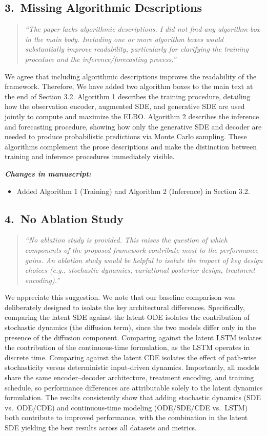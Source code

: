\documentclass[12pt]{article}
\newcommand{\reviewercomment}[1]{%
  \begin{quote}
  \textcolor{reviewergray}{\textit{``#1''}}
  \end{quote}
}
\newcommand{\changes}{\vspace{0.3em}\noindent\textbf{\textit{Changes in manuscript:}}\vspace{0.2em}}
\begin{document}
\subsection*{3.\ Missing Algorithmic Descriptions}

\reviewercomment{The paper lacks algorithmic descriptions. I did not find any algorithm box in the main body. Including one or more algorithm boxes would substantially improve readability, particularly for clarifying the training procedure and the inference/forecasting process.}

We agree that including algorithmic descriptions improves the readability of the framework.
Therefore, We have added two algorithm boxes to the main text at the end of Section 3.2. Algorithm 1 describes the training procedure, detailing how the observation encoder, augmented SDE, and generative SDE are used jointly to compute and maximize the ELBO. Algorithm 2 describes the inference and forecasting procedure, showing how only the generative SDE and decoder are needed to produce probabilistic predictions via Monte Carlo sampling. These algorithms complement the prose descriptions and make the distinction between training and inference procedures immediately visible.

\changes
\begin{itemize}[leftmargin=2em]
\item Added Algorithm 1 (Training) and Algorithm 2 (Inference) in Section 3.2.
\end{itemize}

\subsection*{4.\ No Ablation Study}

\reviewercomment{No ablation study is provided. This raises the question of which components of the proposed framework contribute most to the performance gains. An ablation study would be helpful to isolate the impact of key design choices (e.g., stochastic dynamics, variational posterior design, treatment encoding).}

We appreciate this suggestion. We note that our baseline comparison was deliberately designed to isolate the key architectural differences. Specifically, comparing the latent SDE against the latent ODE isolates the contribution of stochastic dynamics (the diffusion term), since the two models differ only in the presence of the diffusion component. Comparing against the latent LSTM isolates the contribution of the continuous-time formulation, as the LSTM operates in discrete time. Comparing against the latent CDE isolates the effect of path-wise stochasticity versus deterministic input-driven dynamics. Importantly, all models share the same encoder--decoder architecture, treatment encoding, and training schedule, so performance differences are attributable solely to the latent dynamics formulation. The results consistently show that adding stochastic dynamics (SDE vs.\ ODE/CDE) and continuous-time modeling (ODE/SDE/CDE vs.\ LSTM) both contribute to improved performance, with the combination in the latent SDE yielding the best results across all datasets and metrics.
\end{document}
